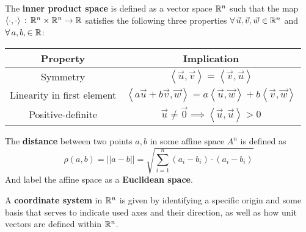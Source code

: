 \documentclass{article}
\begin{document}
		\begin{defn}
			The \textbf{inner product space} is defined as a vector space $\mathbb{R}^n$ such that the map $\left\langle \cdot, \cdot\right\rangle \, : \, \mathbb{R}^n \times \mathbb{R}^n \to \mathbb{R}$ satisfies the following three properties $\forall\,  \vec{u}, \vec{v}, \vec{w} \in \mathbb{R}^n$ and $\forall \, a, b, \in \mathbb{R}$:
			\begin{table}[h]
				\begin{tabular}{|c|c|}
					\hline
					\textbf{Property} & \textbf{Implication} \\ \hline
					Symmetry & $\left\langle \vec{u}, \vec{v} \right\rangle = \left\langle \vec{v}, \vec{u} \right\rangle$ \\ \hline
					Linearity in first element & $\left\langle a\vec{u} + b\vec{v}, \vec{w} \right\rangle = a \left\langle \vec{u}, \vec{w} \right\rangle + b\left\langle \vec{v}, \vec{w} \right\rangle$ \\ \hline
					Positive-definite & $ \vec{u} \neq \vec{0}\implies \left\langle \vec{u}, \vec{u} \right\rangle > 0 $ \\ \hline
				\end{tabular}
			\end{table}
		\end{defn}
		\begin{defn}
			The \textbf{distance} between two points $a,b$ in some affine space $A^n$ is defined as
			\begin{equation}
				\label{eq:EuclidDistance}
				\rho\left(a,b\right) = \left|\left| a-b \right|\right| = \sqrt{\sum_{i=1}^{n} \left(a_i - b_i\right) \cdot \left(a_i - b_i\right) }
			\end{equation}
			And label the affine space as a \textbf{Euclidean space}.
		\end{defn}
		\begin{defn}
			A \textbf{coordinate system} in $\mathbb{R}^n$ is given by identifying a specific origin and some basis that serves to indicate used axes and their direction, as well as how unit vectors are defined within $\mathbb{R}^n$.
		\end{defn}
		
\end{document}
